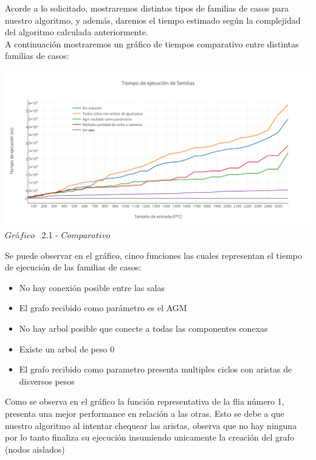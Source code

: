 \indent Acorde a lo solicitado, mostraremos distintos tipos de familias de casos para nuestro algoritmo, y adem\'as, daremos el tiempo estimado 
seg\'un la complejidad del algoritmo calculada anteriormente.\\

A continuaci\'on mostraremos un gr\'afico de tiempos comparativo entre distintas familias de casos:\\ 

\vspace*{0.3cm} \vspace*{0.3cm}
  \begin{center}
 \includegraphics[scale=0.65]{./EJ2/comparativo.png}
 {$Gr$\'a$fico$ \ 2.1 - $Comparativo$}
  \end{center}
  \vspace*{0.3cm}
  
Se puede observar en el gr\'afico, cinco funciones las cuales representan el tiempo de ejecuci\'on de las familias de casos:\\
\begin{itemize}
\item No hay conexi\'on posible entre las salas
\item El grafo recibido como par\'ametro es el AGM
\item No hay arbol posible que conecte a todas las componentes conexas
\item Existe un arbol de peso 0
\item El grafo recibido como parametro presenta multiples ciclos con aristas de disversos pesos
\end{itemize}

Como se observa en el gr\'afico la funci\'on representativa de la flia n\'umero 1, presenta una mejor performance en relaci\'on a las otras. Esto se debe a que nuestro algoritmo al intentar chequear las aristas, observa que no hay ninguna por lo tanto finaliza su ejecuci\'on insumiendo unicamente la creaci\'on del grafo (nodos aislados)

